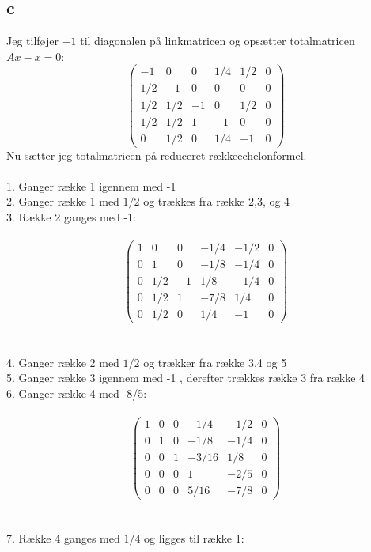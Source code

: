 \documentclass{article}
\begin{document}
\subsection*{c}
Jeg tilføjer $-1$ til diagonalen på linkmatricen og opsætter totalmatricen $Ax-x=0$:
$$
\left(\begin{array}{rrrrr|r}
-1 & 0 & 0 & 1 / 4 & 1 / 2 & 0 \\
1 / 2 & -1 & 0 & 0 & 0 & 0 \\
1 / 2 & 1 / 2 & -1 & 0 & 1 / 2 & 0 \\
1 / 2 & 1 / 2 & 1 & -1 & 0 & 0 \\
0 & 1 / 2 & 0 & 1 / 4 & -1 & 0
\end{array}\right)
$$
Nu sætter jeg totalmatricen på reduceret rækkeechelonformel.
\\
\\
1. Ganger række 1 igennem med -1
\\
2. Ganger række 1 med $1 / 2$ og
trækkes fra række 2,3, og 4
\\
3. Række 2 ganges med -1:
\\
\\
$$\left(\begin{array}{rrrrr|r}1 & 0 & 0 & -1 / 4 & -1 / 2 & 0 \\ 0 & 1 & 0 & -1 / 8 & -1 / 4 & 0 \\ 0 & 1 / 2 & -1 & 1 / 8 & -1 / 4 & 0 \\ 0 & 1 / 2 & 1 & -7 / 8 & 1 / 4 & 0 \\ 0 & 1 / 2 & 0 & 1 / 4 & -1 & 0\end{array}\right)$$
\\
\\
4. Ganger række 2 med $1 / 2$ og trækker fra række 3,4 og 5
\\
5. Ganger række 3 igennem med -1 , derefter trækkes række 3 fra række 4
\\
6. Ganger række 4 med -8/5:
\\
\\
$$\left(\begin{array}{rrrrr|r}1 & 0 & 0 & -1 / 4 & -1 / 2 & 0 \\ 0 & 1 & 0 & -1 / 8 & -1 / 4 & 0 \\ 0 & 0 & 1 & -3 / 16 & 1 / 8 & 0 \\ 0 & 0 & 0 & 1 & -2 / 5 & 0 \\ 0 & 0 & 0 & 5 / 16 & -7 / 8 & 0\end{array}\right)$$
\\
\\
7. Række 4 ganges med $1 / 4$ og ligges til række 1:
\end{document}
